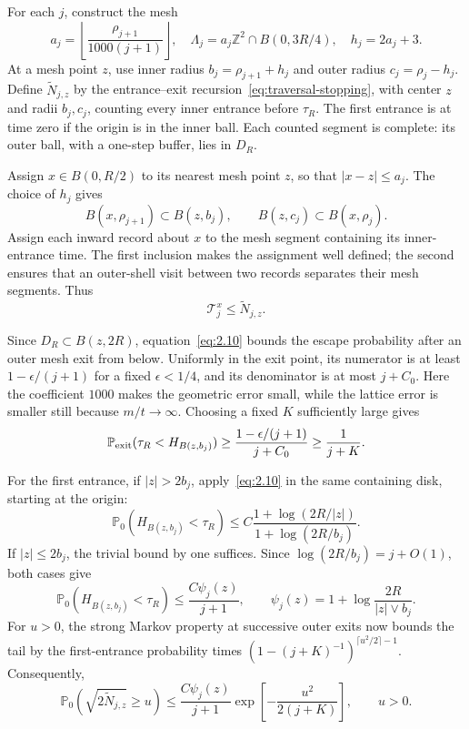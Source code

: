 \documentclass[11pt,letterpaper,reqno]{amsart}
\numberwithin{equation}{section}
\theoremstyle{remark}
\begin{document}
For each $j$, construct the mesh
\[
a_j=\left\lfloor\frac{\rho_{j+1}}{1000(j+1)}\right\rfloor,
\quad \Lambda_j=a_j\mathbb Z^2\cap B(0,3R/4),
\quad h_j=2a_j+3.
\]
At a mesh point $z$, use inner radius $b_j=\rho_{j+1}+h_j$ and outer radius $c_j=\rho_j-h_j$. Define $\widetilde N_{j,z}$ by the entrance--exit recursion~\eqref{eq:traversal-stopping}, with center $z$ and radii $b_j,c_j$, counting every inner entrance before $\tau_R$. The first entrance is at time zero if the origin is in the inner ball. Each counted segment is complete: its outer ball, with a one-step buffer, lies in $D_R$.

Assign $x\in B(0,R/2)$ to its nearest mesh point $z$, so that $|x-z|\le a_j$. The choice of $h_j$ gives
\[
B(x,\rho_{j+1})\subset B(z,b_j),
\qquad B(z,c_j)\subset B(x,\rho_j).
\]
Assign each inward record about $x$ to the mesh segment containing its inner-entrance time. The first inclusion makes the assignment well defined; the second ensures that an outer-shell visit between two records separates their mesh segments. Thus
\begin{equation}\label{eq:4.13}
\mathcal T_j^x\le\widetilde N_{j,z}.
\end{equation}

Since $D_R\subset B(z,2R)$, equation~\eqref{eq:2.10} bounds the escape probability after an outer mesh exit from below. Uniformly in the exit point, its numerator is at least
$1-\epsilon/(j+1)$ for a fixed $\epsilon<1/4$, and its denominator is at most $j+C_0$. Here the coefficient $1000$ makes the geometric error small, while the lattice error is smaller still because $m/t\to\infty$. Choosing a fixed $K$ sufficiently large gives
\[
\mathbb P_{\rm exit}(\tau_R<H_{B(z,b_j)})
\ge\frac{1-\epsilon/(j+1)}{j+C_0}
\ge\frac1{j+K}.
\]

For the first entrance, if $|z|>2b_j$, apply~\eqref{eq:2.10} in the same containing disk, starting at the origin:
\[
\mathbb P_0(H_{B(z,b_j)}<\tau_R)
\le C\frac{1+\log(2R/|z|)}{1+\log(2R/b_j)}.
\]
If $|z|\le2b_j$, the trivial bound by one suffices. Since
$\log(2R/b_j)=j+O(1)$, both cases give
\[
\mathbb P_0(H_{B(z,b_j)}<\tau_R)
\le\frac{C\psi_j(z)}{j+1},
\qquad
\psi_j(z)=1+\log\frac{2R}{|z|\vee b_j}.
\]
For $u>0$, the strong Markov property at successive outer exits now bounds the tail by the first-entrance probability times
$(1-(j+K)^{-1})^{\lceil u^2/2\rceil-1}$. Consequently,
\begin{equation}\label{eq:4.14}
\mathbb P_0(\sqrt{2\widetilde N_{j,z}}\ge u)
\le\frac{C\psi_j(z)}{j+1}
\exp\left[-\frac{u^2}{2(j+K)}\right],
\qquad u>0.
\end{equation}
\end{document}
